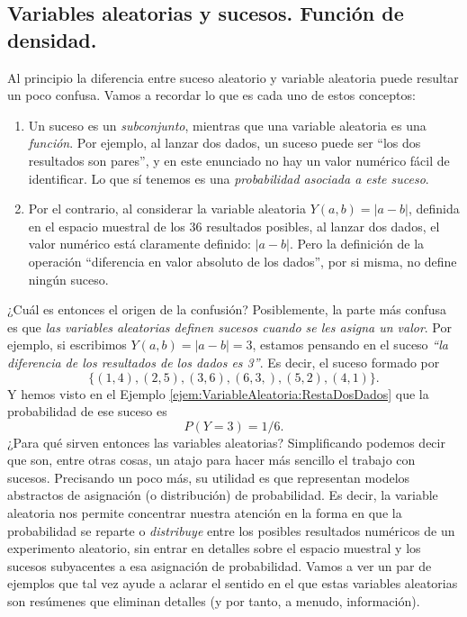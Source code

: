 \subsection{Variables aleatorias y sucesos. Función de densidad.}
\label{cap04:subsec:VariablesAleatoriasSucesos}

Al principio la diferencia entre suceso aleatorio y variable aleatoria puede resultar un poco confusa. Vamos a recordar lo que es cada uno de estos conceptos:
\begin{enumerate}
    \item Un suceso es un {\em subconjunto}, mientras que una variable aleatoria es una {\em función}. Por ejemplo, al lanzar dos dados, un suceso puede ser ``los dos resultados son pares'', y en este enunciado no hay un valor numérico fácil de identificar. Lo que sí tenemos es una {\em probabilidad asociada a este suceso}.
    \item Por el contrario, al considerar la variable aleatoria $Y(a,b)=|a-b|$, definida en el espacio muestral de los 36 resultados posibles, al lanzar dos dados, el valor numérico está claramente definido: $|a-b|$. Pero la definición de la operación {``diferencia en valor absoluto de los dados''}, por si misma, no define ningún suceso.
\end{enumerate}
¿Cuál es entonces el origen de la confusión? Posiblemente, la parte más confusa es que {\sf\em las variables aleatorias definen sucesos cuando se les asigna un valor}. Por ejemplo, si escribimos $Y(a,b)=|a-b|=3$, estamos pensando en el suceso {\em ``la diferencia de los resultados de los dados es 3''}. Es decir, el suceso formado por
\[\{(1,4),(2,5),(3,6),(6,3,),(5,2),(4,1)\}.\]
Y hemos visto en el Ejemplo \ref{ejem:VariableAleatoria:RestaDosDados} que la probabilidad de ese suceso es
\[P(Y=3)=1/6.\]
¿Para qué sirven entonces las variables aleatorias? Simplificando podemos decir que son, entre otras cosas, un atajo para hacer más sencillo el trabajo con sucesos. Precisando un poco más, su utilidad es que representan {\sf modelos abstractos de asignación (o distribución) de probabilidad}. Es decir, la variable aleatoria nos permite concentrar nuestra atención en la forma en que la probabilidad se reparte o {\em distribuye} entre los posibles resultados numéricos de un experimento aleatorio, sin entrar en detalles sobre el espacio muestral y los sucesos subyacentes a esa asignación de probabilidad.  Vamos a ver un par de ejemplos que tal vez ayude a aclarar el sentido en el que estas variables aleatorias son resúmenes que eliminan detalles (y por tanto, a menudo, información).
